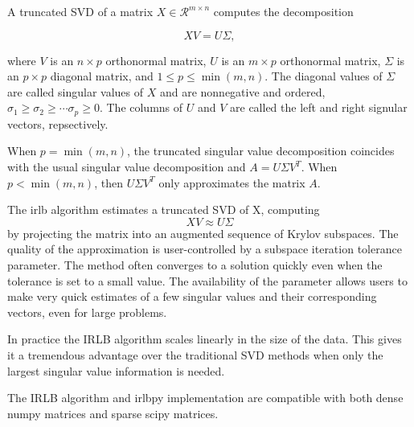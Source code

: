 \documentclass[landscape,a0b,final]{a0poster}
\newenvironment{poster}{
  \begin{center}
  \begin{minipage}[c]{0.98\textwidth}
}{
  \end{minipage} 
  \end{center}
}
\newcommand{\pbox}[4]{
\psshadowbox[#3]{
\begin{minipage}[t][#2][t]{#1}
#4
\end{minipage}
}}
\begin{document}
\begin{poster}
\begin{multicols}{3}
A truncated SVD of a matrix $X \in \mathcal{R}^{m \times n}$ computes the
decomposition

\[
XV = U\Sigma,
\]

where $V$ is an $n\times p$ orthonormal matrix,
$U$ is an $m \times p$ orthonormal matrix, $\Sigma$ is an $p \times p$
diagonal matrix, and $1\le p\le\min(m,n)$.
The diagonal values of $\Sigma$ are called singular values of $X$ and
are nonnegative and ordered,
$\sigma_1\ge \sigma_2\ge \cdots \sigma_p \geq 0$.
The columns of $U$ and $V$ are
called the left and right signular vectors, repsectively.

\vspace{0.75cm}

When $p=\min(m,n)$, the truncated singular value decomposition coincides
with the usual singular value decomposition and $A = U\Sigma V^T$. When
$p<\min(m,n)$, then $U\Sigma V^T$ only approximates the matrix $A$.

\vspace{0.75cm}
The irlb algorithm estimates a truncated SVD of X, computing
\[
XV \approx U\Sigma
\]
by projecting the matrix into an augmented sequence of Krylov subspaces.
The quality of the approximation is user-controlled by a subspace iteration
tolerance parameter. The method often converges to a solution quickly even
when the tolerance is set to a small value. The availability of the parameter
allows users to make very quick estimates of a few singular values and
their corresponding vectors, even for large problems.



\vspace{1cm}\begin{center}\pbox{0.8\columnwidth}{}{linewidth=2mm,framearc=0.1,fillstyle=gradient,gradangle=0,gradbegin=white,gradend=white,gradmidpoint=1.0,framesep=1em}{\begin{center}\bf{Discussion}\end{center}}\end{center}\vspace{1.25cm}

In practice the IRLB algorithm scales linearly in the size of the data.
This gives it a tremendous advantage over the traditional SVD methods when only
the largest singular value information is needed.

\vspace{0.75cm}

The IRLB algorithm and irlbpy implementation are compatible with 
both dense numpy matrices and sparse scipy matrices.


\end{multicols}
\end{poster}
\end{document}
